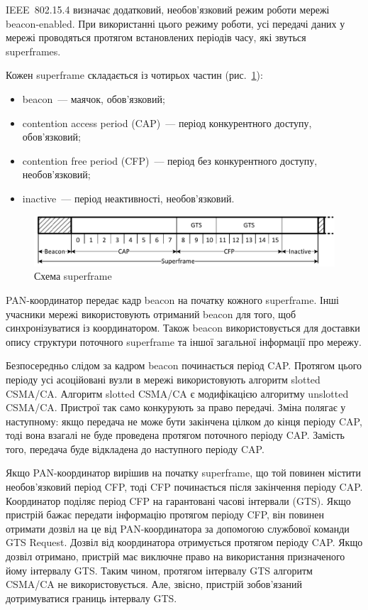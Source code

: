 \documentclass[a4paper,ukrainian,utf8,nocolumnsxix,floatsection,equationsection]{eskdtext}
\newcommand{\figref}[1]{рис.~\ref{#1}}
\newcommand{\iee}[0]{IEEE~802.15.4\xspace}
\newcommand{\csma}[0]{CSMA/CA\xspace}
\newcommand{\ucsma}[0]{unslotted \csma\xspace}
\newcommand{\scsma}[0]{slotted \csma\xspace}
\newcommand{\bem}[0]{beacon-enabled\xspace}
\begin{document}
\iee визначає додатковий, необов’язковий режим роботи мережі \bem. При використанні цього режиму роботи, усі передачі даних у мережі проводяться протягом встановлених періодів часу, які звуться superframes. 

Кожен superframe складається із чотирьох частин (\figref{fig:superframe}):

\begin{itemize}
	\item beacon~--- маячок, обов’язковий;
	\item contention access period (CAP)~--- період конкурентного доступу, обов’язковий;
	\item contention free period (CFP)~--- період без конкурентного доступу, необов’язковий;
	\item inactive~--- період неактивності, необов’язковий.
\end{itemize}

\begin{figure}[htbp]
	\centering
	\includegraphics[width=\textwidth]{img/superframe.pdf}
	\caption{\label{fig:superframe}Схема superframe}
\end{figure}

PAN-координатор передає кадр beacon на початку кожного superframe. Інші учасники мережі використовують отриманий beacon для того, щоб синхронізуватися із координатором. Також beacon використовується для доставки опису структури поточного superframe та іншої загальної інформації про мережу. 

Безпосередньо слідом за кадром beacon починається період CAP. Протягом цього періоду усі асоційовані вузли в мережі використовують алгоритм \scsma. Алгоритм \scsma є модифікацією алгоритму \ucsma. Пристрої так само конкурують за право передачі. Зміна полягає у наступному: якщо передача не може бути закінчена цілком до кінця періоду CAP, тоді вона взагалі не буде проведена протягом поточного періоду CAP. Замість того, передача буде відкладена до наступного періоду CAP. %

Якщо PAN-координатор вирішив на початку superframe, що той повинен містити необов’язковий період CFP, тоді CFP починається після закінчення періоду CAP. Координатор поділяє період CFP на гарантовані часові інтервали (GTS). Якщо пристрій бажає передати інформацію протягом періоду CFP, він повинен отримати дозвіл на це від PAN-координатора за допомогою службової команди GTS Request. Дозвіл від координатора отримується протягом періоду CAP. Якщо дозвіл отримано, пристрій має виключне право на використання призначеного йому інтервалу GTS. Таким чином, протягом інтервалу GTS алгоритм \csma не використовується. Але, звісно, пристрій зобов’язаний дотримуватися границь інтервалу GTS. 
\end{document}
